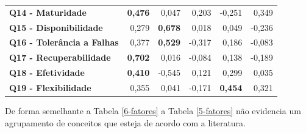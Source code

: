 \begin{apendicesenv}
\begin{longtable}[htbp]{rrrrrr}
    \multicolumn{1}{l}{\textbf{Q14 - Maturidade}} & \textbf{0,476} & 0,047  & 0,203  & -0,251 & 0,349 \\
    \multicolumn{1}{l}{\textbf{Q15 - Disponibilidade}} & 0,279  & \textbf{0,678} & 0,018  & 0,049  & -0,236 \\
    \multicolumn{1}{l}{\textbf{Q16 - Tolerância a Falhas}} & 0,377  & \textbf{0,529} & -0,317 & 0,186  & -0,083 \\
    \multicolumn{1}{l}{\textbf{Q17 - Recuperabilidade}} & \textbf{0,702} & 0,016  & -0,084 & 0,138  & -0,189 \\
    \multicolumn{1}{l}{\textbf{Q18 - Efetividade}} & \textbf{0,410} & -0,545 & 0,121  & 0,299  & 0,035 \\
    \multicolumn{1}{l}{\textbf{Q19 - Flexibilidade}} & 0,355  & 0,041  & -0,171 & \textbf{0,454} & 0,321 \\
    \hline
    
    \end{longtable}%

De forma semelhante a Tabela \ref{6-fatores} a Tabela \ref{5-fatores} não evidencia um agrupamento de conceitos que esteja de acordo com a literatura. 



\end{apendicesenv}
